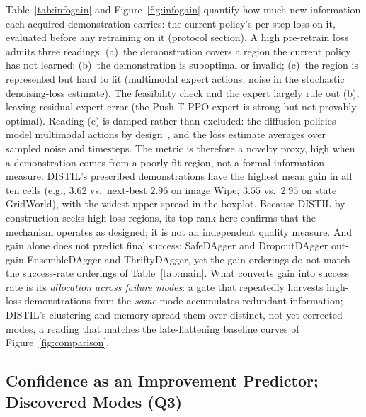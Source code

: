 \documentclass[letterpaper]{article} %
\begin{document}
Table~\ref{tab:infogain} and Figure~\ref{fig:infogain} quantify how much new
information each acquired demonstration carries: the current policy's
per-step loss on it, evaluated before any retraining on it (protocol
section). A high pre-retrain loss admits three
readings: (a)~the demonstration covers a region the current policy has not
learned; (b)~the demonstration is suboptimal or invalid; (c)~the region is
represented but hard to fit (multimodal expert actions; noise in the
stochastic denoising-loss estimate). The feasibility check and the expert
largely rule out (b), leaving residual expert error (the Push-T PPO expert
is strong but not provably optimal). Reading (c) is damped rather than
excluded: the diffusion policies model multimodal actions by
design~\citep{chi2023diffusionpolicy}, and the loss estimate averages over
sampled noise and timesteps. The metric is therefore a novelty proxy, high
when a demonstration comes from a poorly fit region, not a formal
information measure. DISTIL's
prescribed demonstrations have the highest mean gain in all ten
cells (e.g., $3.62$ vs.\ next-best $2.96$ on image Wipe; $3.55$ vs.\ $2.95$
on state GridWorld), with the widest upper spread in the boxplot. Because
DISTIL by construction seeks high-loss regions, its top rank here confirms
that the mechanism operates as designed; it is not an independent quality
measure. And gain alone does not predict final success: SafeDAgger and
DropoutDAgger out-gain EnsembleDAgger and ThriftyDAgger, yet the gain
orderings do not match the success-rate orderings of Table~\ref{tab:main}.
What converts gain into success rate is its \emph{allocation
across failure modes}: a gate that repeatedly harvests high-loss
demonstrations from the \emph{same} mode accumulates redundant information;
DISTIL's clustering and memory spread them over distinct, not-yet-corrected
modes, a reading that matches the late-flattening baseline curves of
Figure~\ref{fig:comparison}.

\subsection{Confidence as an Improvement Predictor; Discovered Modes (Q3)}
\end{document}
